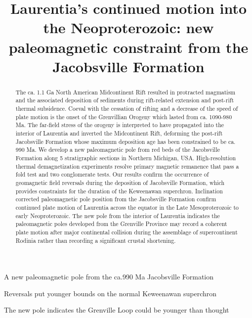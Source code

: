 \documentclass[draft]{agujournal2019}
\begin{document}
\title{Laurentia's continued motion into the Neoproterozoic: new paleomagnetic constraint from the Jacobsville Formation}




\begin{keypoints}
\item A new paleomagnetic pole from the ca.990 Ma Jacobsville Formation 
\item Reversals put younger bounds on the normal Keweenawan superchron 
\item The new pole indicates the Grenville Loop could be younger than thought
\end{keypoints}


\begin{abstract}
The ca. 1.1 Ga North American Midcontinent Rift resulted in protracted magmatism and the associated deposition of sediments during rift-related extension and post-rift thermal subsidence. Coeval with the cessation of rifting and a decrease of the speed of plate motion is the onset of the Grenvillian Orogeny which lasted from ca. 1090-980 Ma. The far-field stress of the orogeny is interpreted to have propagated into the interior of Laurentia and inverted the Midcontinent Rift, deforming the post-rift Jacobsville Formation whose maximum deposition age has been constrained to be ca. 990 Ma. We develop a new paleomagnetic pole from red beds of the Jacobsville Formation along 5 stratigraphic sections in Northern Michigan, USA. High-resolution thermal demagnetization experiments resolve primary magnetic remanence that pass a fold test and two conglomerate tests. Our results confirm the occurrence of geomagnetic field reversals during the deposition of Jacobsville Formation, which provides constraints for the duration of the Keweenawan superchron. Inclination corrected paleomagnetic pole position from the Jacobsville Formation confirm continued plate motion of Laurentia across the equator in the Late Mesoproterozoic to early Neoproterozoic. The new pole from the interior of Laurentia indicates the paleomagnetic poles developed from the Grenville Province may record a coherent plate motion after major continental collision during the assemblage of supercontinent Rodinia rather than recording a significant crustal shortening.
\end{abstract}
\end{document}
